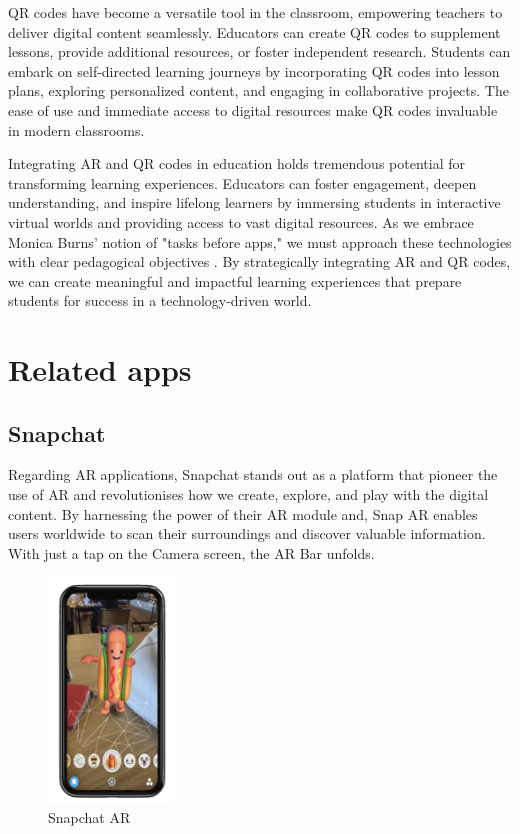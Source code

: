 \ac{QR} codes have become a versatile tool in the classroom, empowering teachers to deliver digital content seamlessly. Educators can create \ac{QR} codes to supplement lessons, provide additional resources, or foster independent research. Students can embark on self-directed learning journeys by incorporating \ac{QR} codes into lesson plans, exploring personalized content, and engaging in collaborative projects. The ease of use and immediate access to digital resources make \ac{QR} codes invaluable in modern classrooms.

Integrating \ac{AR} and \ac{QR} codes in education holds tremendous potential for transforming learning experiences. Educators can foster engagement, deepen understanding, and inspire lifelong learners by immersing students in interactive virtual worlds and providing access to vast digital resources. As we embrace Monica Burns' notion of "tasks before apps," we must approach these technologies with clear pedagogical objectives \cite{Burns2016}. By strategically integrating \ac{AR} and \ac{QR} codes, we can create meaningful and impactful learning experiences that prepare students for success in a technology-driven world.


\section{Related apps}
\subsection*{Snapchat}
Regarding \ac{AR} applications, Snapchat \cite{Snapchat} stands out as a platform that pioneer the use of \ac{AR} and revolutionises how we create, explore, and play with the digital content. By harnessing the power of their \ac{AR} module and, Snap \ac{AR} \cite{SnapAR} enables users worldwide to scan their surroundings and discover valuable information. With just a tap on the Camera screen, the \ac{AR} Bar unfolds.

\begin{figure}
    \centering
    \includegraphics[width=0.3\textwidth]{img/related-apps/Snapchat.png}
    \caption{Snapchat AR}
    \label{fig:snapchat}
\end{figure}

